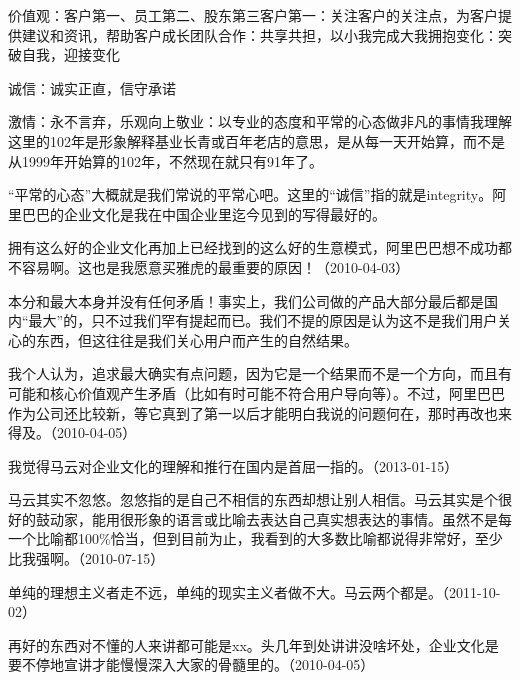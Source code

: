 价值观：客户第一、员工第二、股东第三客户第一：关注客户的关注点，为客户提供建议和资讯，帮助客户成长团队合作：共享共担，以小我完成大我拥抱变化：突破自我，迎接变化

诚信：诚实正直，信守承诺

激情：永不言弃，乐观向上敬业：以专业的态度和平常的心态做非凡的事情我理解这里的102年是形象解释基业长青或百年老店的意思，是从每一天开始算，而不是从1999年开始算的102年，不然现在就只有91年了。

“平常的心态”大概就是我们常说的平常心吧。这里的“诚信”指的就是integrity。阿里巴巴的企业文化是我在中国企业里迄今见到的写得最好的。

拥有这么好的企业文化再加上已经找到的这么好的生意模式，阿里巴巴想不成功都不容易啊。这也是我愿意买雅虎的最重要的原因！（2010-04-03）


本分和最大本身并没有任何矛盾！事实上，我们公司做的产品大部分最后都是国内“最大”的，只不过我们罕有提起而已。我们不提的原因是认为这不是我们用户关心的东西，但这往往是我们关心用户而产生的自然结果。

我个人认为，追求最大确实有点问题，因为它是一个结果而不是一个方向，而且有可能和核心价值观产生矛盾（比如有时可能不符合用户导向等）。不过，阿里巴巴作为公司还比较新，等它真到了第一以后才能明白我说的问题何在，那时再改也来得及。（2010-04-05）


我觉得马云对企业文化的理解和推行在国内是首屈一指的。（2013-01-15）


马云其实不忽悠。忽悠指的是自己不相信的东西却想让别人相信。马云其实是个很好的鼓动家，能用很形象的语言或比喻去表达自己真实想表达的事情。虽然不是每一个比喻都100\%恰当，但到目前为止，我看到的大多数比喻都说得非常好，至少比我强啊。（2010-07-15）

单纯的理想主义者走不远，单纯的现实主义者做不大。马云两个都是。（2011-10-02）


再好的东西对不懂的人来讲都可能是xx。头几年到处讲讲没啥坏处，企业文化是要不停地宣讲才能慢慢深入大家的骨髓里的。（2010-04-05）


